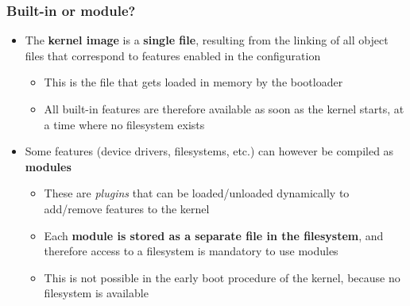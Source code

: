 \begin{frame}
  \frametitle{Built-in or module?}
  \begin{itemize}
  \item The {\bf kernel image} is a {\bf single file}, resulting from
    the linking of all object files that correspond to features
    enabled in the configuration
    \begin{itemize}
    \item This is the file that gets loaded in memory by the
      bootloader
    \item All built-in features are therefore available as soon as the
      kernel starts, at a time where no filesystem exists
    \end{itemize}
  \item Some features (device drivers, filesystems, etc.) can however
    be compiled as {\bf modules}
    \begin{itemize}
    \item These are {\em plugins} that can be loaded/unloaded dynamically to
      add/remove features to the kernel
    \item Each {\bf module is stored as a separate file in the
        filesystem}, and therefore access to a filesystem is mandatory
      to use modules
    \item This is not possible in the early boot procedure of the
      kernel, because no filesystem is available
    \end{itemize}
  \end{itemize}
\end{frame}

